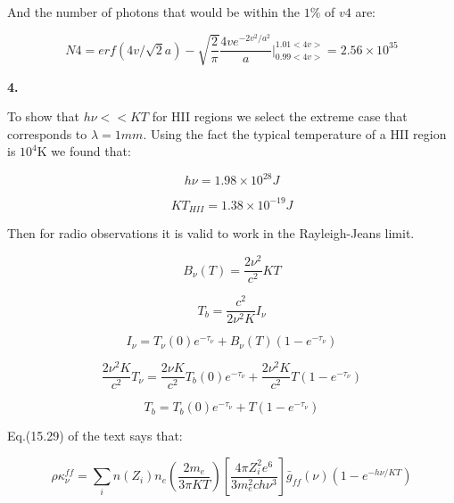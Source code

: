 \documentclass[12pt]{article}
\begin{document}
And the number of photons that would be within the $1\%$
of $v4$ are:

\begin{equation}
N4 = erf(4v/\sqrt{2}a) - \sqrt{\dfrac{2}{\pi}} \dfrac{4v e^{-2v^2/a^2}}{a} \Bigg|_{0.99<4v>}^{1.01<4v>}  = 2.56\times 10^{35} 
\end{equation}




\begin{LARGE}
\textbf{4.}
\end{LARGE}

To show that $h \nu << KT$ for HII regions we select the extreme case that
corresponds to $\lambda = 1mm$. Using the fact the typical temperature 
of a HII region is $10^4$K we found that: 

\begin{equation}
h \nu = 1.98 \times 10 ^{28} J
\end{equation} 

\begin{equation}
KT_{HII} = 1.38 \times 10^{-19} J
\end{equation}

Then for radio observations it is valid to work in the Rayleigh-Jeans limit.

\begin{equation}
B_{\nu}(T) = \dfrac{2\nu^2}{c^2}KT
\end{equation}

\begin{equation}
T_b = \dfrac{c^2}{2\nu^2K}I_{\nu}
\end{equation}

\begin{equation}
I_{\nu} = T_{\nu} (0)  e^{-\tau_{\nu}} + B_{\nu}(T)(1- e^{-\tau_{\nu}})
\end{equation}

\begin{equation}
\dfrac{2 \nu^2 K}{c^2} T_{\nu} = \dfrac{2 \nu K}{c^2}T_b(0)e^{-\tau_{\nu}} + \dfrac{2 \nu^2 K}{c^2} T(1 - e^{-\tau_{\nu}})
\end{equation}

\begin{equation}\label{T}
T_{b} = T_b (0)  e^{-\tau_{\nu}} + T(1- e^{-\tau_{\nu}}) 
\end{equation}

Eq.(15.29) of the text says that:

\begin{equation}\label{1529}
\rho \kappa_{\nu}^{ff} = \sum_{i} n(Z_i) n_e \left( \dfrac{2m_e}{3\pi K T} \right)
\left[ \dfrac{4 \pi Z_i^2 e^6}{3 m_e^2 c h \nu^3} \right] \bar{g}_{ff}(\nu) 
\left( 1 - e^{-h\nu / KT}\right)
\end{equation}
\end{document}
